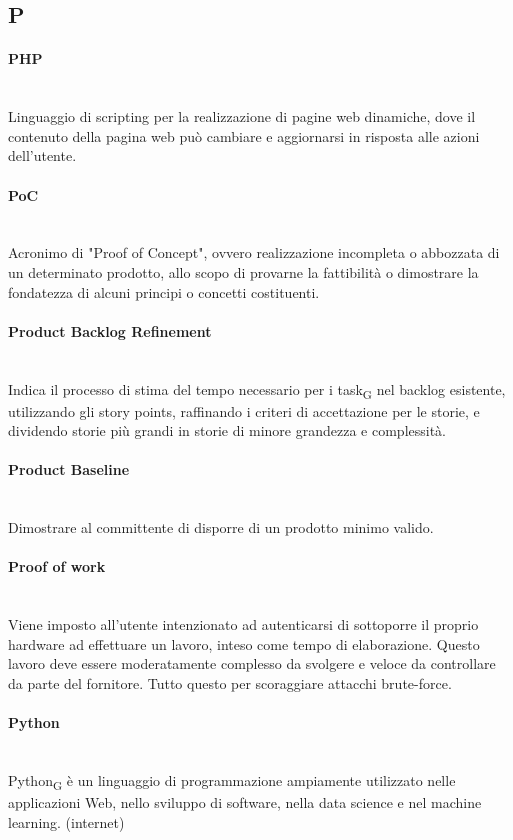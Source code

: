 \subsection*{P}
\paragraph{PHP}~\smallskip \\
Linguaggio di scripting per la realizzazione di pagine web dinamiche, dove il contenuto della pagina web può cambiare e aggiornarsi in risposta alle azioni dell'utente.

\paragraph{PoC}~\smallskip \\
Acronimo di "Proof of Concept", ovvero realizzazione incompleta o abbozzata di un determinato prodotto, allo scopo di provarne la fattibilità o dimostrare la fondatezza di alcuni principi o concetti costituenti.

\paragraph{Product Backlog Refinement}~\smallskip \\
Indica il processo di stima del tempo necessario per i task\textsubscript{G} nel backlog esistente, utilizzando gli story points, 
raffinando i criteri di accettazione per le storie, e dividendo storie più grandi in storie di minore grandezza e complessità.

\paragraph{Product Baseline}~\smallskip \\
Dimostrare al committente di disporre di un prodotto minimo valido.

\paragraph{Proof of work}~\smallskip \\
Viene imposto all'utente intenzionato ad autenticarsi di sottoporre il proprio hardware ad effettuare un lavoro, inteso come tempo di elaborazione. Questo lavoro deve essere moderatamente complesso da svolgere e veloce da controllare da parte del fornitore. Tutto questo per scoraggiare attacchi brute-force.

\paragraph{Python}~\smallskip \\
Python\textsubscript{G} è un linguaggio di programmazione ampiamente utilizzato nelle applicazioni Web, nello sviluppo di software, nella data science e nel machine learning. (internet)
\newpage
{}
